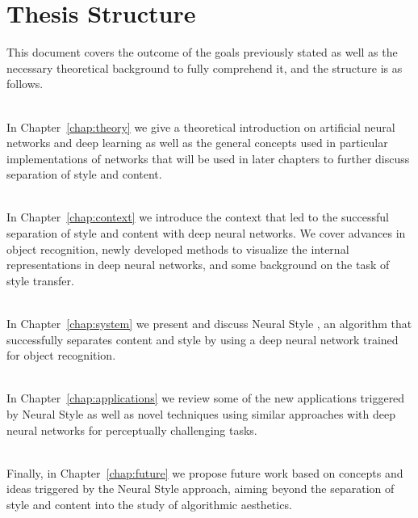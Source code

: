 
\section{Thesis Structure}
\label{sec:intro:structure}

This document covers the outcome of the goals previously stated as well as the necessary theoretical background to fully comprehend it, and the structure is as follows.

\begin{minipage}{\textwidth}
  \textbf{} \\[0.2em]
  In Chapter~\ref{chap:theory} we give a theoretical introduction on artificial neural networks and deep learning as well as the general concepts used in particular implementations of networks that will be used in later chapters to further discuss separation of style and content.
\end{minipage}

\begin{minipage}{\textwidth}
  \textbf{} \\[0.2em]
  In Chapter~\ref{chap:context} we introduce the context that led to the successful separation of style and content with deep neural networks. We cover advances in object recognition, newly developed methods to visualize the internal representations in deep neural networks, and some background on the task of style transfer.
\end{minipage}

\begin{minipage}{\textwidth}
  \textbf{} \\[0.2em]
  In Chapter~\ref{chap:system} we present and discuss Neural Style \cite{Gatys2015B}, an algorithm that successfully separates content and style by using a deep neural network trained for object recognition.
\end{minipage}

\begin{minipage}{\textwidth}
  \textbf{} \\[0.2em]
  In Chapter~\ref{chap:applications} we review some of the new applications triggered by Neural Style as well as novel techniques using similar approaches with deep neural networks for perceptually challenging tasks.
\end{minipage}

\begin{minipage}{\textwidth}
  \textbf{} \\[0.2em]
  Finally, in Chapter~\ref{chap:future} we propose future work based on concepts and ideas triggered by the Neural Style approach, aiming beyond the separation of style and content into the study of algorithmic aesthetics.
\end{minipage}
